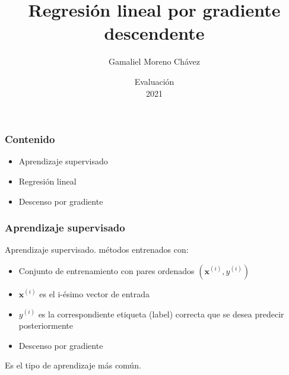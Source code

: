 \documentclass[spanish]{beamer}
\begin{document}
\title{Regresión lineal por gradiente descendente}
\author{Gamaliel Moreno Chávez}
\date{Evaluación\\ 2021}%

\frame{\titlepage}

\begin{frame}
\frametitle{Contenido}
\begin{itemize}
\item Aprendizaje supervisado
\item Regresión lineal 
\item Descenso por gradiente
\end{itemize}
\end{frame}

\begin{frame}
\frametitle{Aprendizaje supervisado}
Aprendizaje supervisado. métodos entrenados con:

\begin{itemize}
\item Conjunto de entrenamiento con pares ordenados $(\mathbf{x}^{(i)},y^{(i)})$
\item $\mathbf{x}^{(i)}$ es el i-ésimo vector de entrada 
\item $y^{(i)}$ es la correspondiente etiqueta (label) correcta que se desea predecir posteriormente
\item Descenso por gradiente
\end{itemize}

Es el tipo de aprendizaje más común.
\end{frame}


\end{document}
